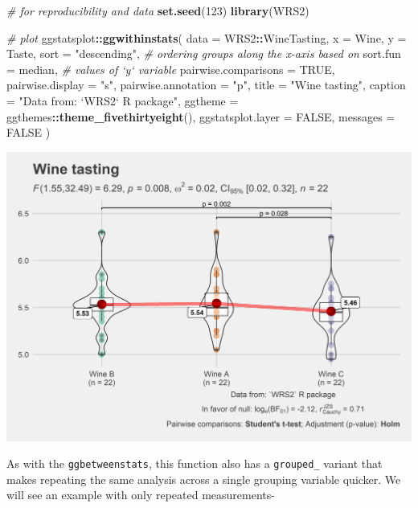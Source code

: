 \documentclass[]{article}
\newenvironment{Shaded}{\begin{snugshade}}{\end{snugshade}}
\newcommand{\CommentTok}[1]{\textcolor[rgb]{0.56,0.35,0.01}{\textit{#1}}}
\newcommand{\DataTypeTok}[1]{\textcolor[rgb]{0.13,0.29,0.53}{#1}}
\newcommand{\DecValTok}[1]{\textcolor[rgb]{0.00,0.00,0.81}{#1}}
\newcommand{\KeywordTok}[1]{\textcolor[rgb]{0.13,0.29,0.53}{\textbf{#1}}}
\newcommand{\NormalTok}[1]{#1}
\newcommand{\OperatorTok}[1]{\textcolor[rgb]{0.81,0.36,0.00}{\textbf{#1}}}
\newcommand{\OtherTok}[1]{\textcolor[rgb]{0.56,0.35,0.01}{#1}}
\newcommand{\StringTok}[1]{\textcolor[rgb]{0.31,0.60,0.02}{#1}}
\begin{document}
\begin{Shaded}
\begin{Highlighting}[]
\CommentTok{# for reproducibility and data}
\KeywordTok{set.seed}\NormalTok{(}\DecValTok{123}\NormalTok{)}
\KeywordTok{library}\NormalTok{(WRS2)}

\CommentTok{# plot}
\NormalTok{ggstatsplot}\OperatorTok{::}\KeywordTok{ggwithinstats}\NormalTok{(}
  \DataTypeTok{data =}\NormalTok{ WRS2}\OperatorTok{::}\NormalTok{WineTasting,}
  \DataTypeTok{x =}\NormalTok{ Wine,}
  \DataTypeTok{y =}\NormalTok{ Taste,}
  \DataTypeTok{sort =} \StringTok{"descending"}\NormalTok{, }\CommentTok{# ordering groups along the x-axis based on}
  \DataTypeTok{sort.fun =}\NormalTok{ median, }\CommentTok{# values of `y` variable}
  \DataTypeTok{pairwise.comparisons =} \OtherTok{TRUE}\NormalTok{,}
  \DataTypeTok{pairwise.display =} \StringTok{"s"}\NormalTok{,}
  \DataTypeTok{pairwise.annotation =} \StringTok{"p"}\NormalTok{,}
  \DataTypeTok{title =} \StringTok{"Wine tasting"}\NormalTok{,}
  \DataTypeTok{caption =} \StringTok{"Data from: `WRS2` R package"}\NormalTok{,}
  \DataTypeTok{ggtheme =}\NormalTok{ ggthemes}\OperatorTok{::}\KeywordTok{theme_fivethirtyeight}\NormalTok{(),}
  \DataTypeTok{ggstatsplot.layer =} \OtherTok{FALSE}\NormalTok{,}
  \DataTypeTok{messages =} \OtherTok{FALSE}
\NormalTok{)}
\end{Highlighting}
\end{Shaded}

\includegraphics[width=1\linewidth]{./figures/paper-ggwithinstats1-1}

As with the \texttt{ggbetweenstats}, this function also has a
\texttt{grouped\_} variant that makes repeating the same analysis across
a single grouping variable quicker. We will see an example with only
repeated measurements-
\end{document}
